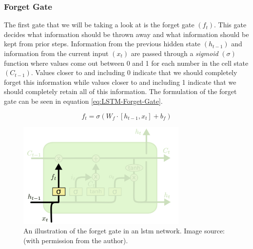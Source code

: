 \subsubsection{Forget Gate}
\label{subsubsec:Background-Information:Forecasting-Models:Long-Short-Term-Memory-Networks:Forget-Gate}
The first gate that we will be taking a look at is the forget gate $(f_t)$. This gate decides what information should be thrown away and what information should be kept from prior steps. Information from the previous hidden state $(h_{t-1})$ and information from the current input $(x_t)$ are passed through a \textit{sigmoid} $(\sigma)$ function where values come out between 0 and 1 for each number in the cell state $(C_{t-1})$. Values closer to and including 0 indicate that we should completely forget this information while values closer to and including 1 indicate that we should completely retain all of this information. The formulation of the forget gate can be seen in equation \ref{eq:LSTM-Forget-Gate}.

\begin{equation}
    f_t = \sigma (W_f \cdot \left[h_{t-1}, x_t\right] + b_f)
\label{eq:LSTM-Forget-Gate}
\end{equation}

\begin{figure}[hbt!]
    \centering
    \includegraphics[width=0.75\textwidth]{Images/Chapter 3/LSTM/LSTM-Forget-Gate-Illustration.pdf}
    \caption{An illustration of the forget gate in an \gls{lstm} network. Image source: \cite{Colah}  (with permission from the author).}
    \label{fig:LSTM-Forget-Gate-Illustration}
\end{figure}

